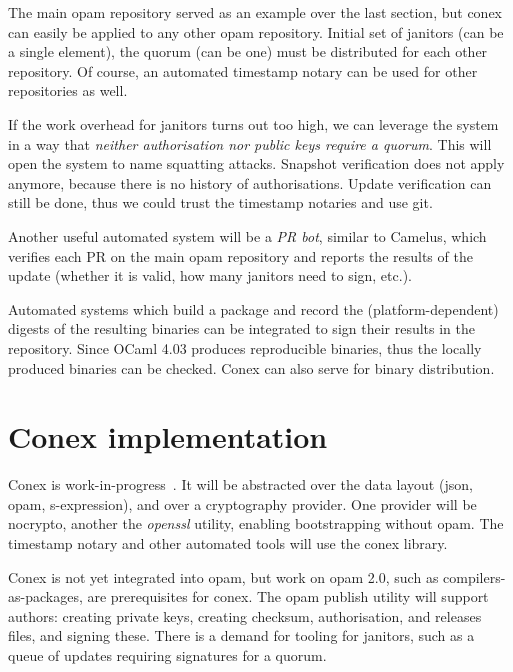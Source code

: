 \documentclass[nocopyrightspace]{sigplanconf}
\newcommand{\TODO}[1]{\textbf{[TODO: #1]}}
\begin{document}
The main opam repository served as an example over the last section, but conex can easily be applied to any other opam repository.
Initial set of janitors (can be a single element), the quorum (can be one) must be distributed for each other repository.
Of course, an automated timestamp notary can be used for other repositories as well.

If the work overhead for janitors turns out too high, we can leverage the system in a way that \emph{neither authorisation nor public keys require a quorum}.
This will open the system to name squatting attacks.
Snapshot verification does not apply anymore, because there is no history of authorisations.
Update verification can still be done, thus we could trust the timestamp notaries and use git.


Another useful automated system will be a \emph{PR bot}, similar to Camelus, which verifies each PR on the main opam repository and reports the results of the update (whether it is valid, how many janitors need to sign, etc.).

Automated systems which build a package and record the (platform-dependent) digests of the resulting binaries can be integrated to sign their results in the repository.
Since OCaml 4.03 produces reproducible binaries, thus the locally produced binaries can be checked.
Conex can also serve for binary distribution.

\section{Conex implementation} \label{sec:implementation}

Conex is work-in-progress~\cite{conex}.
It will be abstracted over the data layout (json, opam, s-expression), and over a cryptography provider.
One provider will be nocrypto, another the \emph{openssl} utility, enabling bootstrapping without opam.
The timestamp notary and other automated tools will use the conex library.

Conex is not yet integrated into opam, but work on opam 2.0, such as compilers-as-packages, are prerequisites for conex.
The opam publish utility will support authors: creating private keys, creating checksum, authorisation, and releases files, and signing these.
There is a demand for tooling for janitors, such as a queue of updates requiring signatures for a quorum.
\end{document}
